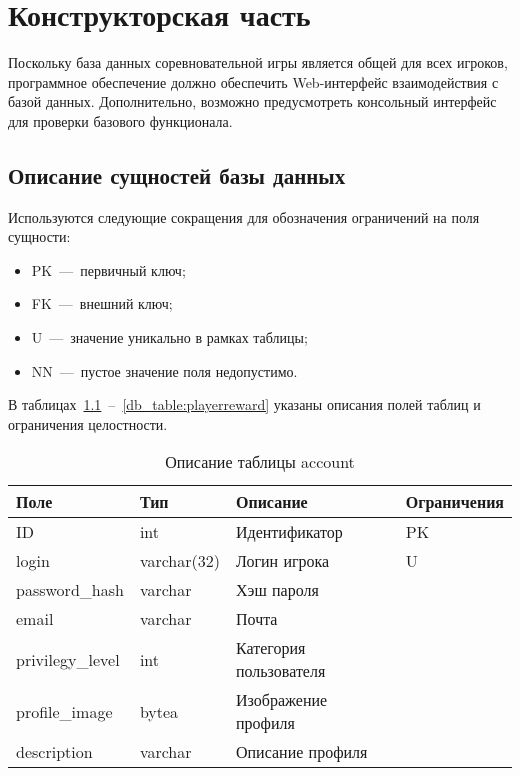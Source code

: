 \chapter{Конструкторская часть}

Поскольку база данных соревновательной игры является общей для всех игроков, программное обеспечение должно обеспечить Web-интерфейс взаимодействия с базой данных. Дополнительно, возможно предусмотреть консольный интерфейс для проверки базового функционала.
\section{Описание сущностей базы данных}

Используются следующие сокращения для обозначения ограничений на поля сущности:
\begin{itemize}
	\item PK~---~первичный ключ;
	\item FK~---~внешний ключ;
	\item U~---~значение уникально в рамках таблицы;
	\item NN~---~пустое значение поля недопустимо.
\end{itemize}

В таблицах~\ref{db_table:account}~--~\ref{db_table:playerreward} указаны описания полей таблиц и ограничения целостности. 

\newenvironment{dbtable}[2]{
\begin{table}[h!]
	\caption{\label{db_table:#1} #2 }
	\begin{tabular}{|p{3cm}|p{3cm}|p{6cm}|p{3cm}|}
	\hline
	Поле & Тип & Описание & Ограничения \\\hline
}
{
\end{tabular}
\end{table}
}

\begin{dbtable}{account}{Описание таблицы account}
	ID & int & Идентификатор & PK \\\hline
	login & varchar(32) & Логин игрока & U \\\hline
	password\_hash & varchar & Хэш пароля & \\\hline
	email & varchar & Почта & \\\hline
	privilegy\_level & int & Категория пользователя &\\\hline
	profile\_image & bytea & Изображение профиля &\\\hline
	description & varchar & Описание профиля &\\\hline
\end{dbtable}

